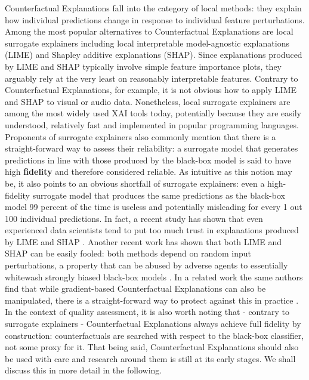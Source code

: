 \documentclass[
  letterpaper,
  DIV=11,
  numbers=noendperiod]{scrartcl}
\begin{document}
Counterfactual Explanations fall into the category of local methods:
they explain how individual predictions change in response to individual
feature perturbations. Among the most popular alternatives to
Counterfactual Explanations are local surrogate explainers including
local interpretable model-agnostic explanations (LIME) and Shapley
additive explanations (SHAP). Since explanations produced by LIME and
SHAP typically involve simple feature importance plots, they arguably
rely at the very least on reasonably interpretable features. Contrary to
Counterfactual Explanations, for example, it is not obvious how to apply
LIME and SHAP to visual or audio data. Nonetheless, local surrogate
explainers are among the most widely used XAI tools today, potentially
because they are easily understood, relatively fast and implemented in
popular programming languages. Proponents of surrogate explainers also
commonly mention that there is a straight-forward way to assess their
reliability: a surrogate model that generates predictions in line with
those produced by the black-box model is said to have high
\textbf{fidelity} and therefore considered reliable. As intuitive as
this notion may be, it also points to an obvious shortfall of surrogate
explainers: even a high-fidelity surrogate model that produces the same
predictions as the black-box model 99 percent of the time is useless and
potentially misleading for every 1 out 100 individual predictions. In
fact, a recent study has shown that even experienced data scientists
tend to put too much trust in explanations produced by LIME and SHAP
\cite{kaur2020interpreting}. Another recent work has shown that both
LIME and SHAP can be easily fooled: both methods depend on random input
perturbations, a property that can be abused by adverse agents to
essentially whitewash strongly biased black-box models
\cite{slack2020fooling}. In a related work the same authors find that
while gradient-based Counterfactual Explanations can also be
manipulated, there is a straight-forward way to protect against this in
practice \cite{slack2021counterfactual}. In the context of quality
assessment, it is also worth noting that - contrary to surrogate
explainers - Counterfactual Explanations always achieve full fidelity by
construction: counterfactuals are searched with respect to the black-box
classifier, not some proxy for it. That being said, Counterfactual
Explanations should also be used with care and research around them is
still at its early stages. We shall discuss this in more detail in the
following.
\end{document}

